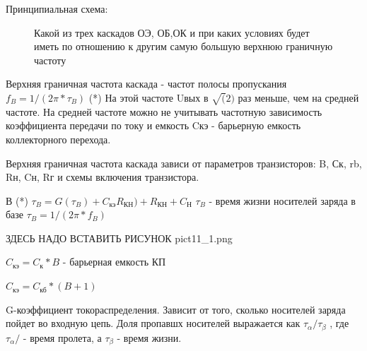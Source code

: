 \documentclass[12pt,a4paper]{article}
\begin{document}
Принципиальная схема:
\begin{center}
        \begin{figure}[h!]
                \caption{Какой из трех каскадов ОЭ, ОБ,ОК и при каких условиях будет иметь по отношению к другим самую большую верхнюю граничную частоту}
        \end{figure}
\end{center}


Верхняя граничная частота каскада - частот полосы пропускания
$f_B = 1/(2\pi*\tau_B)$		(*)
На этой частоте Uвых в $\surd(2)$ раз меньше, чем на средней частоте. На средней частоте можно не учитывать частотную зависимость коэффициента передачи по току и емкость Cкэ - барьерную емкость коллекторного перехода.

Верхняя граничная частота каскада зависи от параметров транзисторов: B, Ск, rb, Rн, Cн, Rг и схемы включения транзистора.

В (*) $\tau_B = G(\tau_B) + C_\textit{кэ}R_\textit{КН})+R_\textit{КН}+C_\textit{Н}$
$\tau_B$ - время жизни носителей заряда в базе
$\tau_B = 1/(2\pi*f_B)$	

ЗДЕСЬ НАДО ВСТАВИТЬ РИСУНОК pict11_1.png


$C_\textit{кэ} = C_\textit{к}*B$ - барьерная емкость КП

$C_\textit{кэ} = C_\textit{кб}*(B+1)$

G-коэффициент токораспределения. Зависит от того, сколько носителей заряда пойдет во входную цепь.
Доля пропавшх носителей выражается как $\tau_\alpha/\tau_\beta$ , где $\tau_\alpha/$ - время пролета, а $\tau_\beta$ - время жизни.
\end{document}

